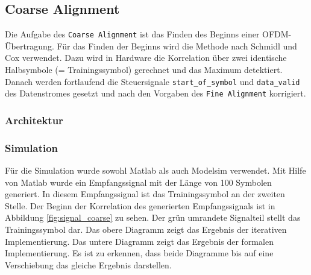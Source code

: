 \subsection{Coarse Alignment}
Die Aufgabe des \texttt{Coarse Alignment} ist das Finden des Beginns einer OFDM-Übertragung. Für das Finden der Beginns wird die Methode nach Schmidl und Cox verwendet. Dazu wird in Hardware die Korrelation über zwei identische Halbsymbole (= Trainingssymbol) gerechnet und das Maximum detektiert. Danach werden fortlaufend die Steuersignale \texttt{start\_of\_symbol} und \texttt{data\_valid} des Datenstromes gesetzt und nach den Vorgaben des \texttt{Fine Alignment} korrigiert.

\subsubsection{Architektur}

\begin{center}
\end{center}

\subsubsection{Simulation}
Für die Simulation wurde sowohl Matlab als auch Modelsim verwendet. Mit Hilfe von Matlab wurde ein Empfangssignal mit der Länge von 100 Symbolen generiert. In diesem Empfangssignal ist das Trainingssymbol an der zweiten Stelle. Der Beginn der Korrelation des generierten Empfangssignals ist in Abbildung \ref{fig:signal_coarse} zu sehen. Der grün umrandete Signalteil stellt das Trainingssymbol dar. Das obere Diagramm zeigt das Ergebnis der iterativen Implementierung. Das untere Diagramm zeigt das Ergebnis der formalen Implementierung. Es ist zu erkennen, dass beide Diagramme bis auf eine Verschiebung das gleiche Ergebnis darstellen.

\begin{center}
\end{center}


